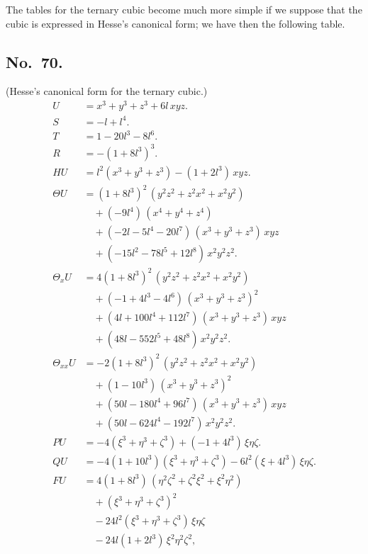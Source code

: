 \documentclass[11pt]{article}
\begin{document}
\bigskip

The tables for the ternary cubic become much more simple if we suppose that the cubic is expressed in Hesse's canonical form; we have then the following table.

\subsection*{No.\ 70.}

\noindent (Hesse's canonical form for the ternary cubic.)
\begin{align*}
U &= x^3 + y^3 + z^3 + 6 l\,xyz. \\[3pt]
S &= -l + l^4. \\[3pt]
T &= 1 - 20 l^3 - 8 l^6. \\[3pt]
R &= -(1 + 8 l^3)^3. \\[3pt]
HU &= l^2 (x^3 + y^3 + z^3) - (1 + 2 l^3)\,xyz. \\[3pt]
\Theta U &= (1 + 8 l^3)^2\,(y^2 z^2 + z^2 x^2 + x^2 y^2) \\
   &\quad + (-9 l^4)\,(x^4 + y^4 + z^4) \\
   &\quad + (-2l - 5 l^4 - 20 l^7)\,(x^3 + y^3 + z^3)\,xyz \\
   &\quad + (-15 l^2 - 78 l^5 + 12 l^8)\,x^2 y^2 z^2. \\[3pt]
\Theta_x U &= 4(1 + 8 l^3)^2\,(y^2 z^2 + z^2 x^2 + x^2 y^2) \\
   &\quad + (-1 + 4 l^3 - 4 l^6)\,(x^3 + y^3 + z^3)^2 \\
   &\quad + (4 l + 100 l^4 + 112 l^7)\,(x^3 + y^3 + z^3)\,xyz \\
   &\quad + (48 l - 552 l^5 + 48 l^8)\,x^2 y^2 z^2. \\[3pt]
\Theta_{xx} U &= -2(1 + 8 l^3)^2\,(y^2 z^2 + z^2 x^2 + x^2 y^2) \\
   &\quad + (1 - 10 l^3)\,(x^3 + y^3 + z^3)^2 \\
   &\quad + (50 l - 180 l^4 + 96 l^7)\,(x^3 + y^3 + z^3)\,xyz \\
   &\quad + (50 l - 624 l^4 - 192 l^7)\,x^2 y^2 z^2. \\[3pt]
PU &= -4 (\xi^3 + \eta^3 + \zeta^3) + (-1 + 4 l^3)\,\xi\eta\zeta. \\[3pt]
QU &= -4 (1 + 10 l^3) (\xi^3 + \eta^3 + \zeta^3) - 6 l^2 (\xi + 4 l^3)\,\xi\eta\zeta. \\[3pt]
FU &= 4 (1 + 8 l^3)\,(\eta^2 \zeta^2 + \zeta^2 \xi^2 + \xi^2 \eta^2) \\
   &\quad + (\xi^3 + \eta^3 + \zeta^3)^2 \\
   &\quad - 24 l^2 (\xi^3 + \eta^3 + \zeta^3)\,\xi\eta\zeta \\
   &\quad - 24 l (1 + 2 l^3)\,\xi^2 \eta^2 \zeta^2,
\end{align*}
\end{document}
